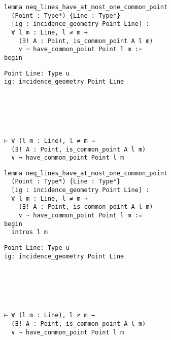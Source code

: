 \begin{frame}[fragile]
	\begin{multicols}{2}
		\begin{lstlisting}
lemma neq_lines_have_at_most_one_common_point 
  (Point : Type*) {Line : Type*} 
  [ig : incidence_geometry Point Line] :
  ∀ l m : Line, l ≠ m → 
    (∃! A : Point, is_common_point A l m) 
    ∨ ¬ have_common_point Point l m := 
begin
\end{lstlisting}
		\columnbreak
		\begin{lstlisting}
Point Line: Type u
ig: incidence_geometry Point Line






⊢ ∀ (l m : Line), l ≠ m → 
  (∃! A : Point, is_common_point A l m) 
  ∨ ¬ have_common_point Point l m
		\end{lstlisting}
	\end{multicols}
\end{frame}










\begin{frame}[fragile]
	\begin{multicols}{2}
		\begin{lstlisting}
lemma neq_lines_have_at_most_one_common_point 
  (Point : Type*) {Line : Type*} 
  [ig : incidence_geometry Point Line] :
  ∀ l m : Line, l ≠ m → 
    (∃! A : Point, is_common_point A l m) 
    ∨ ¬ have_common_point Point l m := 
begin
  intros l m
\end{lstlisting}
		\columnbreak
		\begin{lstlisting}
Point Line: Type u
ig: incidence_geometry Point Line






⊢ ∀ (l m : Line), l ≠ m → 
  (∃! A : Point, is_common_point A l m) 
  ∨ ¬ have_common_point Point l m
		\end{lstlisting}
	\end{multicols}
\end{frame}










